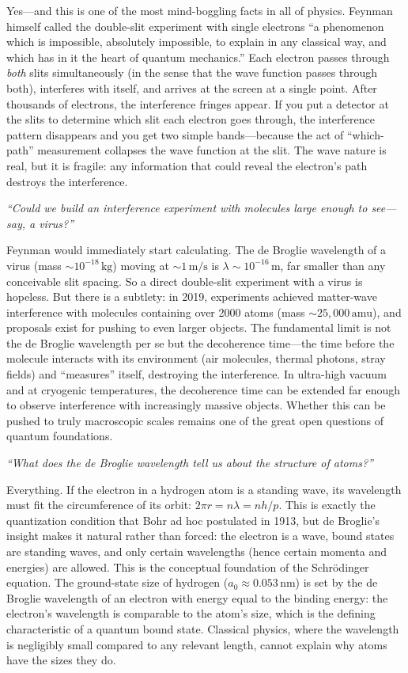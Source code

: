 \documentclass[11pt,openright]{book}
\begin{document}
Yes---and this is one of the most mind-boggling facts in all of physics. Feynman himself called the double-slit experiment with single electrons ``a phenomenon which is impossible, absolutely impossible, to explain in any classical way, and which has in it the heart of quantum mechanics.'' Each electron passes through \emph{both} slits simultaneously (in the sense that the wave function passes through both), interferes with itself, and arrives at the screen at a single point. After thousands of electrons, the interference fringes appear. If you put a detector at the slits to determine which slit each electron goes through, the interference pattern disappears and you get two simple bands---because the act of ``which-path'' measurement collapses the wave function at the slit. The wave nature is real, but it is fragile: any information that could reveal the electron's path destroys the interference.

\textit{``Could we build an interference experiment with molecules large enough to see---say, a virus?''}

Feynman would immediately start calculating. The de Broglie wavelength of a virus (mass $\sim 10^{-18}\,\text{kg}$) moving at $\sim 1\,\text{m/s}$ is $\lambda \sim 10^{-16}\,\text{m}$, far smaller than any conceivable slit spacing. So a direct double-slit experiment with a virus is hopeless. But there is a subtlety: in 2019, experiments achieved matter-wave interference with molecules containing over 2000 atoms (mass $\sim 25{,}000\,\text{amu}$), and proposals exist for pushing to even larger objects. The fundamental limit is not the de Broglie wavelength per se but the decoherence time---the time before the molecule interacts with its environment (air molecules, thermal photons, stray fields) and ``measures'' itself, destroying the interference. In ultra-high vacuum and at cryogenic temperatures, the decoherence time can be extended far enough to observe interference with increasingly massive objects. Whether this can be pushed to truly macroscopic scales remains one of the great open questions of quantum foundations.

\textit{``What does the de Broglie wavelength tell us about the structure of atoms?''}

Everything. If the electron in a hydrogen atom is a standing wave, its wavelength must fit the circumference of its orbit: $2\pi r = n\lambda = nh/p$. This is exactly the quantization condition that Bohr ad hoc postulated in 1913, but de Broglie's insight makes it natural rather than forced: the electron is a wave, bound states are standing waves, and only certain wavelengths (hence certain momenta and energies) are allowed. This is the conceptual foundation of the Schrödinger equation. The ground-state size of hydrogen ($a_0 \approx 0.053\,\text{nm}$) is set by the de Broglie wavelength of an electron with energy equal to the binding energy: the electron's wavelength is comparable to the atom's size, which is the defining characteristic of a quantum bound state. Classical physics, where the wavelength is negligibly small compared to any relevant length, cannot explain why atoms have the sizes they do.
\end{document}
